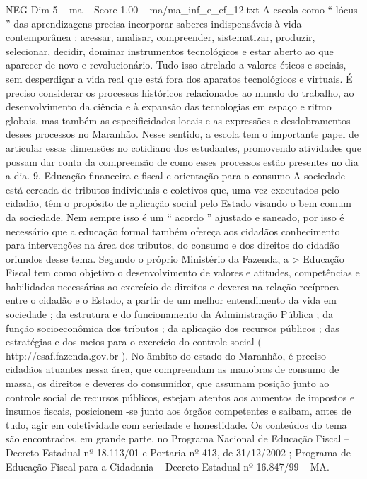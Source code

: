 \begin{textsample}{NEG Dim 5 – ma – Score 1.00 – ma/ma\_inf\_e\_ef\_12.txt}
A escola como “ lócus ” das aprendizagens precisa incorporar saberes indispensáveis à vida contemporânea : acessar, analisar, compreender, sistematizar, produzir, selecionar, decidir, dominar instrumentos tecnológicos e estar aberto ao que aparecer de novo e revolucionário.
Tudo isso atrelado a valores éticos e sociais, sem desperdiçar a vida real que está fora dos aparatos tecnológicos e virtuais.
É preciso considerar os processos históricos relacionados ao mundo do trabalho, ao desenvolvimento da ciência e à expansão das tecnologias em espaço e ritmo globais, mas também as especificidades locais e as expressões e desdobramentos desses processos no Maranhão.
Nesse sentido, a escola tem o importante papel de articular essas dimensões no cotidiano dos estudantes, promovendo atividades que possam dar conta da compreensão de como esses processos estão presentes no dia a dia. 9.
Educação financeira e fiscal e orientação para o consumo A sociedade está cercada de tributos individuais e coletivos que, uma vez executados pelo cidadão, têm o propósito de aplicação social pelo Estado visando o bem comum da sociedade.
Nem sempre isso é um “ acordo ” ajustado e saneado, por isso é necessário que a educação formal também ofereça aos cidadãos conhecimento para intervenções na área dos tributos, do consumo e dos direitos do cidadão oriundos desse tema.
Segundo o próprio Ministério da Fazenda, a > Educação Fiscal tem como objetivo o desenvolvimento de valores e atitudes, competências e habilidades necessárias ao exercício de direitos e deveres na relação recíproca entre o cidadão e o Estado, a partir de um melhor entendimento da vida em sociedade ; da estrutura e do funcionamento da Administração Pública ; da função socioeconômica dos tributos ; da aplicação dos recursos públicos ; das estratégias e dos meios para o exercício do controle social ( http://esaf.fazenda.gov.br ).
No âmbito do estado do Maranhão, é preciso cidadãos atuantes nessa área, que compreendam as manobras de consumo de massa, os direitos e deveres do consumidor, que assumam posição junto ao controle social de recursos públicos, estejam atentos aos aumentos de impostos e insumos fiscais, posicionem -se junto aos órgãos competentes e saibam, antes de tudo, agir em coletividade com seriedade e honestidade.
Os conteúdos do tema são encontrados, em grande parte, no Programa Nacional de Educação Fiscal – Decreto Estadual nº 18.113/01 e Portaria nº 413, de 31/12/2002 ; Programa de Educação Fiscal para a Cidadania – Decreto Estadual nº 16.847/99 – MA.

\end{textsample}

